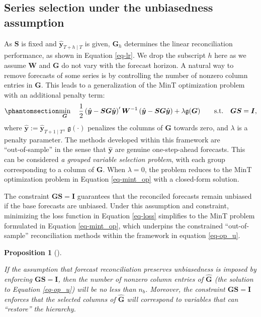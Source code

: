 \documentclass[
  11pt]{article}
\theoremstyle{plain}
\newtheorem{proposition}{Proposition}[section]
\theoremstyle{remark}
\begin{document}
\subsection{Series selection under the unbiasedness
assumption}\label{sec-constrained}

As \(\bm{S}\) is fixed and \(\hat{\bm{y}}_{T+h \mid T}\) is given,
\(\bm{G}_h\) determines the linear reconciliation performance, as shown
in Equation \eqref{eq-lr}. We drop the subscript \(h\) here as we assume
\(\bm{W}\) and \(\bm{G}\) do not vary with the forecast horizon. A
natural way to remove forecasts of some series is by controlling the
number of nonzero column entries in \(\bm{G}\). This leads to a
generalization of the MinT optimization problem with an additional
penalty term: \begin{equation}\phantomsection\label{eq-op_u}{
\min_{\bm{G}} \quad \frac{1}{2}\left(\hat{\bm{y}}-\bm{SG}\hat{\bm{y}}\right)^{\prime} \bm{W}^{-1}\left(\hat{\bm{y}}-\bm{SG}\hat{\bm{y}}\right)
+ \lambda\mathfrak{g}(\bm{G}) \qquad \text{s.t.} \quad \bm{G}\bm{S}=\bm{I},
}\end{equation} where \(\hat{\bm{y}}:=\hat{\bm{y}}_{T+1 \mid T}\),
\(\mathfrak{g}(\cdot)\) penalizes the columns of \(\bm{G}\) towards
zero, and \(\lambda\) is a penalty parameter. The methods developed
within this framework are ``out‑of‑sample'' in the sense that
\(\hat{\bm{y}}\) are genuine one-step-ahead forecasts. This can be
considered \emph{a grouped variable selection problem}, with each group
corresponding to a column of \(\bm{G}\). When \(\lambda = 0\), the
problem reduces to the MinT optimization problem in Equation
\eqref{eq-mint_op} with a closed-form solution.

The constraint \(\bm{G}\bm{S}=\bm{I}\) guarantees that the reconciled
forecasts remain unbiased if the base forecasts are unbiased. Under this
assumption and constraint, minimizing the loss function in Equation
\eqref{eq-loss} simplifies to the MinT problem formulated in Equation
\eqref{eq-mint_op}, which underpins the constrained ``out-of-sample''
reconciliation methods within the framework in equation \eqref{eq-op_u}.

\begin{proposition}[]\protect\hypertarget{prp-1}{}\label{prp-1}

If the assumption that forecast reconciliation preserves unbiasedness is
imposed by enforcing \(\bm{GS}=\bm{I}\), then the number of nonzero
column entries of \(\hat{\bm{G}}\) (the solution to Equation
\eqref{eq-op_u}) will be no less than \(n_b\). Moreover, the constraint
\(\bm{GS}=\bm{I}\) enforces that the selected columns of
\(\hat{\bm{G}}\) will correspond to variables that can ``restore'' the
hierarchy.

\end{proposition}
\end{document}
